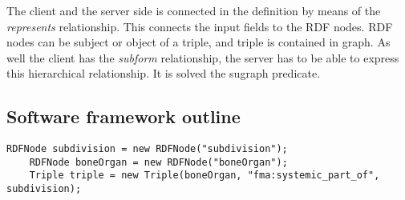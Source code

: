 

The client and the server side is connected in the definition by means of the  \textit{represents} relationship. This connects the input fields to the RDF nodes. RDF nodes can be subject or object of a triple, and triple is contained in graph. As well the client has the \textit{subform} relationship, the server has to be able to express this hierarchical relationship. It is solved the sugraph predicate. 


\subsection{Software framework outline} \label{[332}


\begin{lstlisting}[captionpos=b, caption=SPARQL query for the form data, label={sparqlExisting},
basicstyle=\footnotesize,frame=single]
	RDFNode subdivision = new RDFNode("subdivision");
	RDFNode boneOrgan = new RDFNode("boneOrgan");
	Triple triple = new Triple(boneOrgan, "fma:systemic_part_of", subdivision);
\end{lstlisting}







